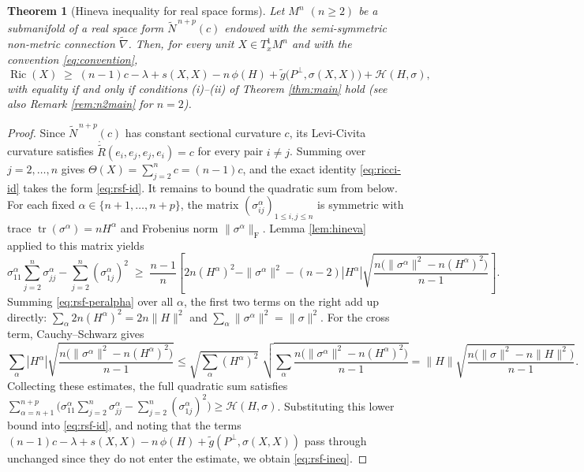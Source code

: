 \documentclass[11pt]{article}
\newtheorem{theorem}{Theorem}[section]
\theoremstyle{definition}
\newcommand{\tN}{\widetilde{N}}
\newcommand{\tg}{\widetilde{g}}
\newcommand{\tnabla}{\widetilde{\nabla}}
\newcommand{\ctR}{\mathring{\widetilde{R}}}
\newcommand{\Ric}{\operatorname{Ric}}
\newcommand{\tr}{\operatorname{tr}}
\newcommand{\HH}{\mathcal{H}}
\newcommand{\Frob}{\mathrm{F}}
\begin{document}
\begin{theorem}[Hineva inequality for real space forms]\label{thm:rsf}
Let $M^n$ $(n\ge2)$ be a submanifold of a real space form $\tN^{\,n+p}(c)$ endowed with the semi-symmetric non-metric connection $\tnabla$. Then, for every unit $X\in T^1_xM^n$ and with the convention \eqref{eq:convention},
\begin{equation}\label{eq:rsf-ineq}
\Ric(X)\;\ge\;(n-1)c-\lambda+s(X,X)-n\,\phi(H)+\tg\bigl(P^\perp,\sigma(X,X)\bigr)+\HH(H,\sigma),
\end{equation}
with equality if and only if conditions (i)--(ii) of Theorem \ref{thm:main} hold (see also Remark \ref{rem:n2main} for $n=2$).
\end{theorem}
\begin{proof}
Since $\tN^{\,n+p}(c)$ has constant sectional curvature $c$, its Levi-Civita curvature satisfies $\ctR(e_i,e_j,e_j,e_i)=c$ for every pair $i\neq j$. Summing over $j=2,\dots,n$ gives $\Theta(X)=\sum_{j=2}^{n}c=(n-1)c$, and the exact identity \eqref{eq:ricci-id} takes the form \eqref{eq:rsf-id}. It remains to bound the quadratic sum from below. For each fixed $\alpha\in\{n+1,\dots,n+p\}$, the matrix $(\sigma^\alpha_{ij})_{1\le i,j\le n}$ is symmetric with trace $\tr(\sigma^\alpha)=nH^\alpha$ and Frobenius norm $\|\sigma^\alpha\|_{\Frob}$. Lemma \ref{lem:hineva} applied to this matrix yields
\begin{equation}\label{eq:rsf-peralpha}
\sigma^\alpha_{11}\sum_{j=2}^{n}\sigma^\alpha_{jj}-\sum_{j=2}^{n}(\sigma^\alpha_{1j})^2\;\ge\;\frac{n-1}{n}\left[2n(H^\alpha)^2-\|\sigma^\alpha\|^2-(n-2)|H^\alpha|\sqrt{\frac{n\bigl(\|\sigma^\alpha\|^2-n(H^\alpha)^2\bigr)}{n-1}}\right].
\end{equation}
Summing \eqref{eq:rsf-peralpha} over all $\alpha$, the first two terms on the right add up directly: $\sum_\alpha2n(H^\alpha)^2=2n\|H\|^2$ and $\sum_\alpha\|\sigma^\alpha\|^2=\|\sigma\|^2$. For the cross term, Cauchy--Schwarz gives
\begin{equation}\label{eq:rsf-cs}
\sum_\alpha|H^\alpha|\sqrt{\frac{n\bigl(\|\sigma^\alpha\|^2-n(H^\alpha)^2\bigr)}{n-1}}\le\sqrt{\sum_\alpha(H^\alpha)^2}\;\sqrt{\sum_\alpha\frac{n\bigl(\|\sigma^\alpha\|^2-n(H^\alpha)^2\bigr)}{n-1}}=\|H\|\sqrt{\frac{n\bigl(\|\sigma\|^2-n\|H\|^2\bigr)}{n-1}}.
\end{equation}
Collecting these estimates, the full quadratic sum satisfies $\sum_{\alpha=n+1}^{n+p}\bigl(\sigma^\alpha_{11}\sum_{j=2}^{n}\sigma^\alpha_{jj}-\sum_{j=2}^{n}(\sigma^\alpha_{1j})^2\bigr)\ge\HH(H,\sigma)$. Substituting this lower bound into \eqref{eq:rsf-id}, and noting that the terms $(n-1)c-\lambda+s(X,X)-n\,\phi(H)+\tg(P^\perp,\sigma(X,X))$ pass through unchanged since they do not enter the estimate, we obtain \eqref{eq:rsf-ineq}.


\end{proof}
\end{document}
